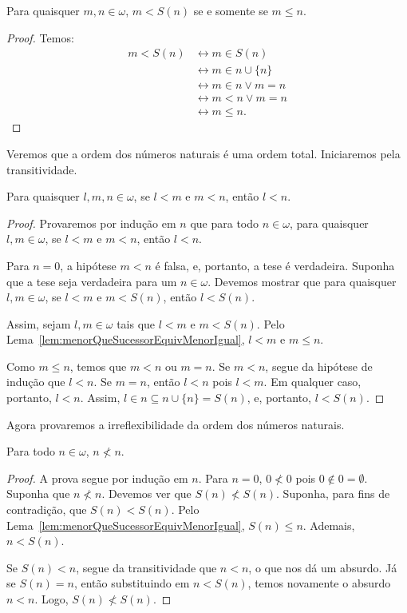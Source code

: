 \begin{lemma}[$Z^--P$]\label{lem:menorQueSucessorEquivMenorIgual}
    Para quaisquer $m, n \in \omega$, $m < S(n)$ se e somente se $m \leq n$.
\end{lemma}
\begin{proof}
    Temos:
    \begin{align*}
        m < S(n) &\leftrightarrow m \in S(n)\\
        &\leftrightarrow m \in n \cup \{n\}\\
        &\leftrightarrow m \in n \lor m = n\\
        &\leftrightarrow m < n \lor m = n\\
        &\leftrightarrow m \leq n.
    \end{align*}
\end{proof}
Veremos que a ordem dos números naturais é uma ordem total.
Iniciaremos pela transitividade.
\begin{lemma}[$Z^--P$]\label{lem:transitividadeDaOrdemNosNaturais}
    Para quaisquer $l, m, n \in \omega$, se $l < m$ e $m < n$, então $l < n$.
\end{lemma}
\begin{proof}
    Provaremos por indução em $n$ que para todo $n \in \omega$, para quaisquer $l, m \in \omega$, se $l < m$ e $m < n$, então $l < n$.

    Para $n=0$, a hipótese $m < n$ é falsa, e, portanto, a tese é verdadeira.
    Suponha que a tese seja verdadeira para um $n \in \omega$.
    Devemos mostrar que para quaisquer $l, m \in \omega$, se $l < m$ e $m < S(n)$, então $l < S(n)$.
    
    Assim, sejam $l, m \in \omega$ tais que $l < m$ e $m < S(n)$.
    Pelo Lema~\ref{lem:menorQueSucessorEquivMenorIgual}, $l < m$ e $m \leq n$.

    Como $m\leq n$, temos que $m<n$ ou $m=n$.
    Se $m<n$, segue da hipótese de indução que $l < n$.
    Se $m=n$, então $l < n$ pois $l < m$.
    Em qualquer caso, portanto, $l<n$.
    Assim, $l \in n \subseteq n \cup \{n\}=S(n)$, e, portanto, $l < S(n)$.
\end{proof}

Agora provaremos a irreflexibilidade da ordem dos números naturais.
\begin{lemma}[$Z^--P$]\label{lem:irreflexividadeDaOrdemNosNaturais}
    Para todo $n \in \omega$, $n \not< n$.
\end{lemma}
\begin{proof}
    A prova segue por indução em $n$.
    Para $n=0$, $0\not< 0$ pois $0\notin 0=\emptyset$.
    Suponha que $n \not< n$. Devemos ver que $S(n) \not< S(n)$.
    Suponha, para fins de contradição, que $S(n) < S(n)$.
    Pelo Lema~\ref{lem:menorQueSucessorEquivMenorIgual}, $S(n) \leq n$.
    Ademais, $n< S(n)$.
    
    Se $S(n)<n$, segue da transitividade que $n<n$, o que nos dá um absurdo.
    Já se $S(n)=n$, então substituindo em $n< S(n)$, temos novamente o absurdo $n<n$.
    Logo, $S(n)\not< S(n)$.
\end{proof}


